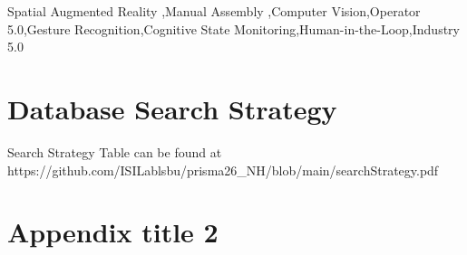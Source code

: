 \documentclass[final,5p,times,twocolumn,numbers,sort&compress]{elsarticle}
\begin{document}
\begin{frontmatter}
\begin{keyword}
Spatial Augmented Reality \sep Manual Assembly \sep Computer Vision\sep Operator 5.0\sep Gesture Recognition\sep Cognitive State Monitoring\sep Human-in-the-Loop\sep Industry 5.0





\end{keyword}


\end{frontmatter}


\begingroup
\small
\setlength{\bibsep}{0pt}
\renewcommand{\baselinestretch}{0.97}\normalsize
% 


\endgroup



\appendix


\section{Database Search Strategy}
\label{appendixA}
Search Strategy Table can be found at https://github.com/ISILablsbu/prisma26_NH/blob/main/searchStrategy.pdf

\section{Appendix title 2}
\end{document}
